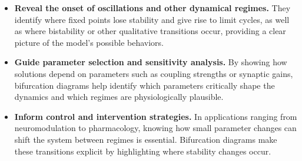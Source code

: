 \begin{itemize}
    \item \textbf{Reveal the onset of oscillations and other dynamical regimes.}
    They identify where fixed points lose stability and give rise to limit cycles, as well as where bistability or other qualitative transitions occur, providing a clear picture of the model’s possible behaviors.

    \item \textbf{Guide parameter selection and sensitivity analysis.}
    By showing how solutions depend on parameters such as coupling strengths or synaptic gains, bifurcation diagrams help identify which parameters critically shape the dynamics and which regimes are physiologically plausible.

    \item \textbf{Inform control and intervention strategies.}
    In applications ranging from neuromodulation to pharmacology, knowing how small parameter changes can shift the system between regimes is essential. Bifurcation diagrams make these transitions explicit by highlighting where stability changes occur.
\end{itemize}
 

\clearpage

